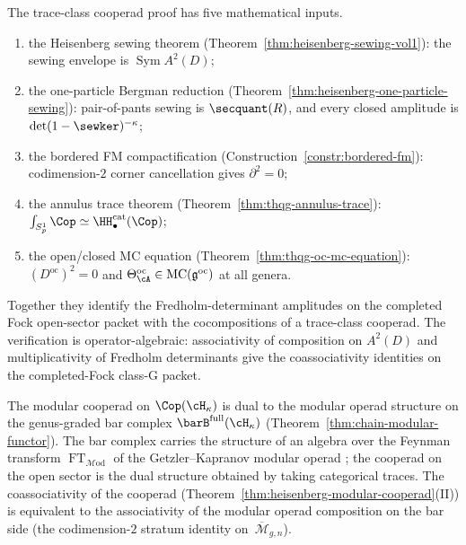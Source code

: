 \begin{remark}
\label{rem:ct2-heisenberg-dependencies}
The trace-class cooperad proof has five mathematical inputs.
\begin{enumerate}[label=\textup{(\arabic*)},nosep]
\item the Heisenberg sewing theorem
 (Theorem~\ref{thm:heisenberg-sewing-vol1}): the sewing envelope is
 $\operatorname{Sym} A^2(D)$;
\item the one-particle Bergman reduction
 (Theorem~\ref{thm:heisenberg-one-particle-sewing}): pair-of-pants
 sewing is $\secquant(R)$, and every closed amplitude is
 $\det(1 - \sewker)^{-\kappa}$;
\item the bordered FM compactification
 (Construction~\ref{constr:bordered-fm}): codimension-$2$
 corner cancellation gives $\partial^2 = 0$;
\item the annulus trace theorem
 (Theorem~\ref{thm:thqg-annulus-trace}):
 $\int_{S^1_p} \Cop \simeq \HH^{\mathrm{cat}}_\bullet(\Cop)$;
\item the open/closed MC equation
 (Theorem~\ref{thm:thqg-oc-mc-equation}):
 $(D^{\mathrm{oc}})^2 = 0$ and
 $\Theta^{\mathrm{oc}}_\cA \in \operatorname{MC}(\mathfrak{g}^{\mathrm{oc}})$
 at all genera.
\end{enumerate}
Together they identify the Fredholm-determinant amplitudes on the
completed Fock open-sector packet with the cocompositions of a
trace-class cooperad. The verification is operator-algebraic:
associativity of composition on $A^2(D)$ and multiplicativity of
Fredholm determinants give the coassociativity identities on the
completed-Fock class-G packet.
\end{remark}

\begin{remark}
\label{rem:heisenberg-cooperad-feynman}
The modular cooperad on $\Cop(\cH_\kappa)$ is dual to the
modular operad structure on the genus-graded bar complex
$\barB^{\mathrm{full}}(\cH_\kappa)$
(Theorem~\ref{thm:chain-modular-functor}). The bar complex
carries the structure of an algebra over the Feynman transform
$\operatorname{FT}_{\mathcal{M}\mathrm{od}}$
of the Getzler--Kapranov modular operad
\cite{GeK98}; the cooperad on the open sector is the dual
structure obtained by taking categorical traces. The
coassociativity of the cooperad
(Theorem~\ref{thm:heisenberg-modular-cooperad}(II))
is equivalent to the associativity of the modular operad
composition on the bar side (the codimension-$2$ stratum identity
on~$\overline{\mathcal{M}}_{g,n}$).
\end{remark}

